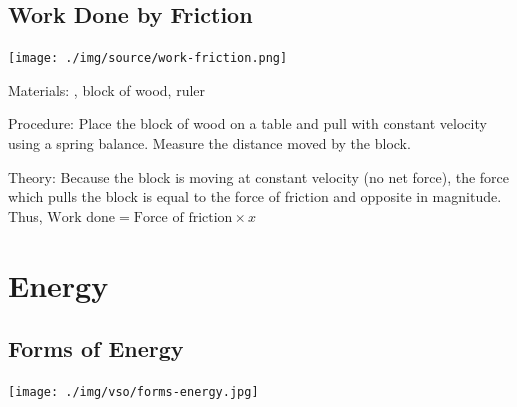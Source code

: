 \begin{multicols}{2}
\subsection{Work Done by Friction}

\begin{center}
\texttt{[image: ./img/source/work-friction.png]}
\end{center}

\begin{description*}
\item[Materials:]{, block of wood, ruler}
\item[Procedure:]{Place the block of wood on a table and pull with constant velocity using a spring balance. Measure the distance moved by the block.}
\item[Theory:]{Because the block is moving at constant velocity (no net force), the force which pulls the block is equal to the force of friction and opposite in magnitude. Thus, $\text{Work done} = \text{Force of friction} \times x$}
\end{description*}


\section*{Energy}


\subsection{Forms of Energy}

\begin{center}
\texttt{[image: ./img/vso/forms-energy.jpg]}
\end{center}


\end{multicols}

